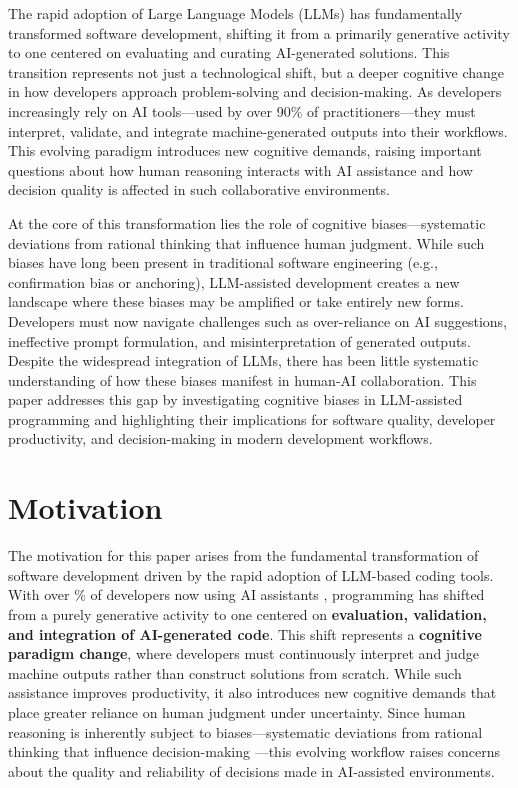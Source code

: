 The rapid adoption of Large Language Models (LLMs) has fundamentally transformed software development, shifting it from a primarily generative activity to one centered on evaluating and curating AI-generated solutions. This transition represents not just a technological shift, but a deeper cognitive change in how developers approach problem-solving and decision-making. As developers increasingly rely on AI tools—used by over 90\% of practitioners—they must interpret, validate, and integrate machine-generated outputs into their workflows. This evolving paradigm introduces new cognitive demands, raising important questions about how human reasoning interacts with AI assistance and how decision quality is affected in such collaborative environments.

At the core of this transformation lies the role of cognitive biases—systematic deviations from rational thinking that influence human judgment. While such biases have long been present in traditional software engineering (e.g., confirmation bias or anchoring), LLM-assisted development creates a new landscape where these biases may be amplified or take entirely new forms. Developers must now navigate challenges such as over-reliance on AI suggestions, ineffective prompt formulation, and misinterpretation of generated outputs. Despite the widespread integration of LLMs, there has been little systematic understanding of how these biases manifest in human-AI collaboration. This paper addresses this gap by investigating cognitive biases in LLM-assisted programming and highlighting their implications for software quality, developer productivity, and decision-making in modern development workflows.

\section{Motivation}
The motivation for this paper arises from the fundamental transformation of software development driven by the rapid adoption of LLM-based coding tools. With over \% of developers now using AI assistants \cite{github2023copilot}, programming has shifted from a purely generative activity to one centered on \textbf{evaluation, validation, and integration of AI-generated code}. This shift represents a \textbf{cognitive paradigm change}, where developers must continuously interpret and judge machine outputs rather than construct solutions from scratch. While such assistance improves productivity, it also introduces new cognitive demands that place greater reliance on human judgment under uncertainty. Since human reasoning is inherently subject to biases—systematic deviations from rational thinking that influence decision-making \cite{tversky1974judgment, kahneman2011thinking}—this evolving workflow raises concerns about the quality and reliability of decisions made in AI-assisted environments.

